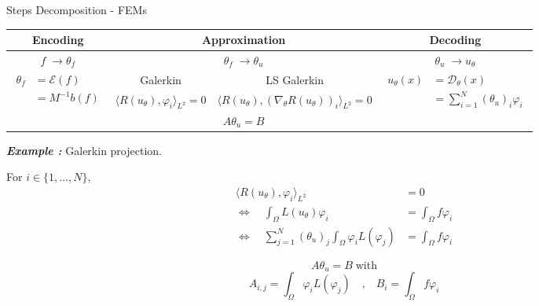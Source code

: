 \begin{frame}{Steps Decomposition - FEMs}
	\begin{center}
		\renewcommand{\arraystretch}{1.5}
		\begin{tabular}{|c|c|c|c|}
			\hline
			\textbf{Encoding} & \multicolumn{2}{c|}{\textbf{Approximation}} & \textbf{Decoding} \\
			\hline
			$f \; \rightarrow \theta_f$ & \multicolumn{2}{c|}{$\theta_f \; \rightarrow \theta_u$} & $\theta_u \; \rightarrow u_\theta$ \\
			\hline
			\multirow{3}{*}{$\begin{aligned}
				\theta_f&=\mathcal{E}(f) \\
				&=M^{-1}b(f)
			\end{aligned}$} & Galerkin & LS Galerkin & \multirow{3}{*}{$\begin{aligned}
				u_\theta(x)&=\mathcal{D}_\theta(x) \\
				&=\sum_{i=1}^N (\theta_u)_i\varphi_i
			\end{aligned}$} \\
			 & \small $\langle R(u_\theta),\varphi_i\rangle_{L^2}=0$ & \small $\langle R(u_\theta),(\nabla_\theta R(u_\theta))_i\rangle_{L^2}=0$ & \\
			\cline{2-3}
			 & \multicolumn{2}{c|}{$A\theta_u=B$} & \\
			 \hline
		\end{tabular}
	\end{center}

	\footnotesize
	\textit{\textbf{Example :}} Galerkin projection.
	
	\begin{minipage}{0.48\linewidth}
		For $i\in\{1,\dots,N\}$,
		\begin{align*}
			\langle R(u_\theta),\varphi_i\rangle_{L^2}&=0 \\
			\iff \quad \int_\Omega L(u_\theta)\varphi_i &= \int_\Omega f\varphi_i \\
			\iff \quad \sum_{j=1}^N(\theta_u)_j \int_\Omega \varphi_i L(\varphi_j) &= \int_\Omega f\varphi_i
		\end{align*}
	\end{minipage}
	\begin{minipage}{0.48\linewidth}
		\begin{equation*}
			A\theta_u=B \; \text{with}
		\end{equation*}
		\begin{equation*}
			A_{i,j} = \int_\Omega \varphi_i L(\varphi_j) \quad \text{,} \quad B_i =  \int_\Omega f\varphi_i
		\end{equation*}
	\end{minipage}
\end{frame}